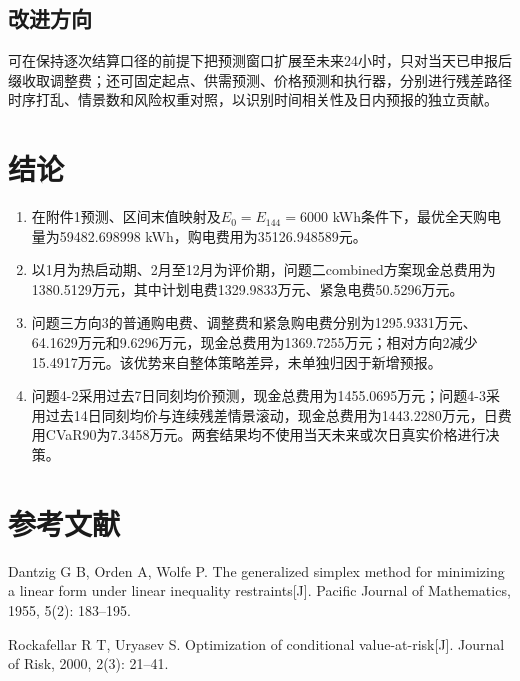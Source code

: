 \documentclass[UTF8,a4paper,12pt]{ctexart}
\begin{document}
\subsection{改进方向}
可在保持逐次结算口径的前提下把预测窗口扩展至未来24小时，只对当天已申报后缀收取调整费；还可固定起点、供需预测、价格预测和执行器，分别进行残差路径时序打乱、情景数和风险权重对照，以识别时间相关性及日内预报的独立贡献。

\section{结论}
\begin{enumerate}[label=\textbf{问题\chinese*：},leftmargin=5.5em]
  \item 在附件1预测、区间末值映射及$E_0=E_{144}=6000$ kWh条件下，最优全天购电量为59482.698998 kWh，购电费用为35126.948589元。
  \item 以1月为热启动期、2月至12月为评价期，问题二combined方案现金总费用为1380.5129万元，其中计划电费1329.9833万元、紧急电费50.5296万元。
  \item 问题三方向3的普通购电费、调整费和紧急购电费分别为1295.9331万元、64.1629万元和9.6296万元，现金总费用为1369.7255万元；相对方向2减少15.4917万元。该优势来自整体策略差异，未单独归因于新增预报。
  \item 问题4-2采用过去7日同刻均价预测，现金总费用为1455.0695万元；问题4-3采用过去14日同刻均价与连续残差情景滚动，现金总费用为1443.2280万元，日费用CVaR90为7.3458万元。两套结果均不使用当天未来或次日真实价格进行决策。
\end{enumerate}


\section*{参考文献}
\begin{enumerate}[label={\textnormal{[\arabic*]}},leftmargin=3em]
  \item Dantzig G B, Orden A, Wolfe P. The generalized simplex method for minimizing a linear form under linear inequality restraints[J]. Pacific Journal of Mathematics, 1955, 5(2): 183--195.
  \item Rockafellar R T, Uryasev S. Optimization of conditional value-at-risk[J]. Journal of Risk, 2000, 2(3): 21--41.
\end{enumerate}
\end{document}
